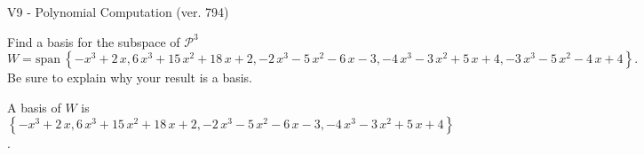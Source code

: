 \begin{exercise}
  \begin{exerciseTitle}V9 - Polynomial Computation (ver. 794)\end{exerciseTitle}
  \begin{exerciseStatement}
    Find a basis for the subspace of \(\mathcal{P}^3\) 
\[W=\mathrm{span}\ \left\{-x^{3} + 2 \, x , 6 \, x^{3} + 15 \, x^{2} + 18 \, x + 2 , -2 \, x^{3} - 5 \, x^{2} - 6 \, x - 3 , -4 \, x^{3} - 3 \, x^{2} + 5 \, x + 4 , -3 \, x^{3} - 5 \, x^{2} - 4 \, x + 4\right\}.\]
 Be sure to explain why your result is a basis.


  \end{exerciseStatement}
  \begin{exerciseAnswer}
   A basis of \(W\) is  \(\left\{-x^{3} + 2 \, x , 6 \, x^{3} + 15 \, x^{2} + 18 \, x + 2 , -2 \, x^{3} - 5 \, x^{2} - 6 \, x - 3 , -4 \, x^{3} - 3 \, x^{2} + 5 \, x + 4\right\}\).
  


  \end{exerciseAnswer}
\end{exercise}